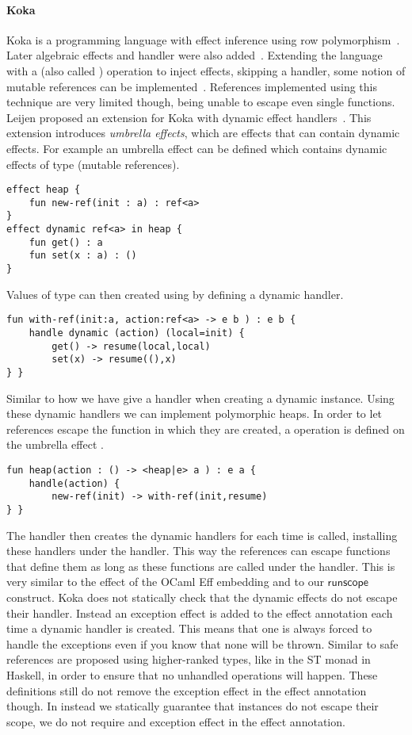 \paragraph{Koka}
Koka is a programming language with effect inference using row polymorphism~\cite{koka}.
Later algebraic effects and handler were also added~\cite{koka2}.
Extending the language with a  (also called ) operation to inject effects, skipping a handler, some notion of mutable references can be implemented~\cite{handlewithcare}.
References implemented using this technique are very limited though, being unable to escape even single functions.
Leijen proposed an extension for Koka with dynamic effect handlers~\cite{kokadynamic}.
This extension introduces \emph{umbrella effects}, which are effects that can contain dynamic effects.
For example an umbrella effect  can be defined which contains dynamic effects of type  (mutable references).
\begin{verbatim}
effect heap {
	fun new-ref(init : a) : ref<a>
}
effect dynamic ref<a> in heap {
	fun get() : a
	fun set(x : a) : ()
}
\end{verbatim}
Values of type  can then created using by defining a dynamic handler.
\begin{verbatim}
fun with-ref(init:a, action:ref<a> -> e b ) : e b {
	handle dynamic (action) (local=init) {
		get() -> resume(local,local)
		set(x) -> resume((),x)
} }
\end{verbatim}
Similar to how we have give a handler when creating a dynamic instance.
Using these dynamic handlers we can implement polymorphic heaps.
In order to let references escape the function in which they are created, a  operation is defined on the umbrella effect .
\begin{verbatim}
fun heap(action : () -> <heap|e> a ) : e a {
	handle(action) {
		new-ref(init) -> with-ref(init,resume)
} }
\end{verbatim}
The  handler then creates the dynamic  handlers for each time  is called, installing these handlers under the  handler.
This way the references can escape functions that define them as long as these functions are called under the  handler.
This is very similar to the  effect of the OCaml Eff embedding and to our $\mathsf{runscope}$ construct.
Koka does not statically check that the dynamic effects do not escape their handler.
Instead an exception effect is added to the effect annotation each time a dynamic handler is created.
This means that one is always forced to handle the exceptions even if you know that none will be thrown.
Similar to \lang{} safe references are proposed using higher-ranked types, like in the ST monad in Haskell, in order to ensure that no unhandled operations will happen.
These definitions still do not remove the exception effect in the effect annotation though.
In \lang{} instead we statically guarantee that instances do not escape their scope, we do not require and exception effect in the effect annotation.

